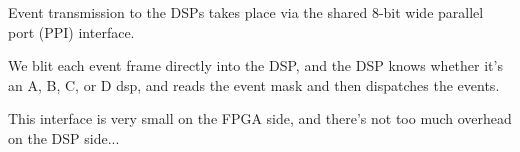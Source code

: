 Event transmission to the DSPs takes place via the shared 8-bit wide
parallel port (PPI) interface.

We blit each event frame directly into the DSP, and the 
DSP knows whether it's an A, B, C, or D dsp, and reads the 
event mask and then dispatches the events. 

This interface is very small on the FPGA side, and there's not too
much overhead on the DSP side...

